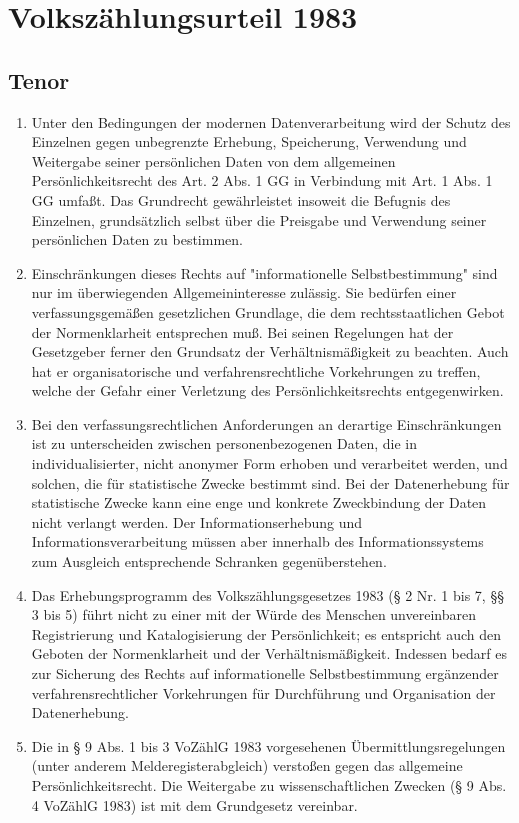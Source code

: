 \chapter{Volkszählungsurteil 1983}
    \section{Tenor}
        \begin{enumerate}
            \item Unter den Bedingungen der modernen Datenverarbeitung wird der Schutz des Einzelnen gegen unbegrenzte Erhebung, Speicherung, Verwendung und Weitergabe seiner persönlichen Daten von dem allgemeinen Persönlichkeitsrecht des Art. 2 Abs. 1 GG in Verbindung mit Art. 1 Abs. 1 GG umfaßt. Das Grundrecht gewährleistet insoweit die Befugnis des Einzelnen, grundsätzlich selbst über die Preisgabe und Verwendung seiner persönlichen Daten zu bestimmen.
            \item Einschränkungen dieses Rechts auf "informationelle Selbstbestimmung" sind nur im überwiegenden Allgemeininteresse zulässig. Sie bedürfen einer verfassungsgemäßen gesetzlichen Grundlage, die dem rechtsstaatlichen Gebot der Normenklarheit entsprechen muß. Bei seinen Regelungen hat der Gesetzgeber ferner den Grundsatz der Verhältnismäßigkeit zu beachten. Auch hat er organisatorische und verfahrensrechtliche Vorkehrungen zu treffen, welche der Gefahr einer Verletzung des Persönlichkeitsrechts entgegenwirken.     \item Bei den verfassungsrechtlichen Anforderungen an derartige Einschränkungen ist zu unterscheiden zwischen personenbezogenen Daten, die in individualisierter, nicht anonymer Form erhoben und verarbeitet werden, und solchen, die für statistische Zwecke bestimmt sind. Bei der Datenerhebung für statistische Zwecke kann eine enge und konkrete Zweckbindung der Daten nicht verlangt werden. Der Informationserhebung und Informationsverarbeitung müssen aber innerhalb des Informationssystems zum Ausgleich entsprechende Schranken gegenüberstehen.
            \item Das Erhebungsprogramm des Volkszählungsgesetzes 1983 (§ 2 Nr. 1 bis 7, §§ 3 bis 5) führt nicht zu einer mit der Würde des Menschen unvereinbaren Registrierung und Katalogisierung der Persönlichkeit; es entspricht auch den Geboten der Normenklarheit und der Verhältnismäßigkeit. Indessen bedarf es zur Sicherung des Rechts auf informationelle Selbstbestimmung ergänzender verfahrensrechtlicher Vorkehrungen für Durchführung und Organisation der Datenerhebung. 
            \item Die in § 9 Abs. 1 bis 3 VoZählG 1983 vorgesehenen Übermittlungsregelungen (unter anderem Melderegisterabgleich) verstoßen gegen das allgemeine Persönlichkeits\-recht. Die Weitergabe zu wissenschaftlichen Zwecken (§ 9 Abs. 4 VoZählG 1983) ist mit dem Grundgesetz vereinbar. 
        \end{enumerate}
